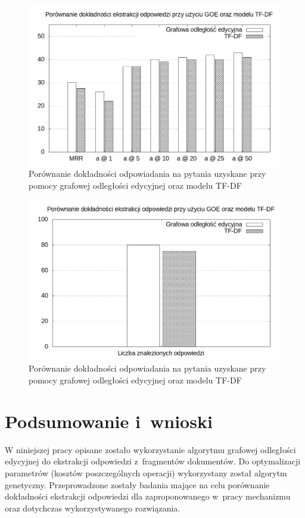 \documentclass[a4paper, twoside, openright, 12pt]{report}
\begin{document}
        \begin{figure}[p]
                \centering
                \includegraphics[scale=0.5]{mrr}
                \caption{Porównanie dokładności odpowiadania na pytania uzyskane przy pomocy grafowej odległości edycyjnej
                    oraz modelu TF-DF}
                \label{RESULTS1}
        \end{figure}

        \begin{figure}[p]
                \centering
                \includegraphics[scale=0.5]{znalezione_odpowiedzi}
                \caption{Porównanie dokładności odpowiadania na pytania uzyskane przy pomocy grafowej odległości edycyjnej
                    oraz modelu TF-DF}
                \label{RESULTS2}
        \end{figure}

\chapter{Podsumowanie i~wnioski}
    W niniejszej pracy opisane zostało wykorzystanie algorytmu grafowej odległości edycyjnej do ekstrakcji odpowiedzi
    z~fragmentów dokumentów. Do optymalizacji parametrów (kosztów poszczególnych operacji) wykorzystany został
    algorytm genetyczny. Przeprowadzone zostały badania mające na celu porównanie dokładności ekstrakcji odpowiedzi
    dla zaproponowanego w~pracy mechanizmu oraz dotychczas wykorzystywanego rozwiązania.
\end{document}
